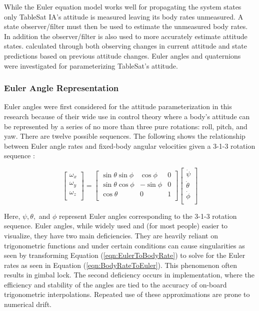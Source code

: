While the Euler equation model works well for propagating the system states only TableSat IA's attitude is measured leaving its body rates unmeasured.  A state observer/filter must then be used to estimate the unmeasured body rates.  In addition the observer/filter is also used to more accurately estimate attitude states. calculated through both observing changes in current attitude and state predictions based on previous attitude changes.  Euler angles and quaternions were investigated for parameterizing TableSat's attitude.

\subsubsection{Euler Angle Representation}

Euler angles were first considered for the attitude parameterization in this research because of their wide use in control theory where a body's attitude can be represented by a series of no more than three pure rotations: roll, pitch, and yaw.   There are twelve possible sequences.  The following shows the relationship between Euler angle rates and fixed-body angular velocities given a 3-1-3 rotation sequence \cite{kaplan}:

\begin{equation}
  \begin{bmatrix}
    \omega_x \\
    \omega_y \\
    \omega_z \\
  \end{bmatrix}
  =
  \begin{bmatrix}
    \sin \theta \sin \phi & \cos \phi & 0 \\
    \sin \theta \cos \phi & - \sin \phi & 0 \\
    \cos \theta & 0 & 1 \\
  \end{bmatrix}
  \begin{bmatrix}
    \dot{\psi} \\
    \dot{\theta} \\
    \dot{\phi} \\
  \end{bmatrix}
  \label{eqn:EulerToBodyRate}
\end{equation}

Here, $\psi, \theta,$ and $\phi$ represent Euler angles corresponding to the 3-1-3 rotation sequence.  Euler angles, while widely used and (for most people) easier to visualize, they have two main deficiencies.  They are heavily reliant on trigonometric functions and under certain conditions can cause singularities as seen by transforming Equation (\ref{eqn:EulerToBodyRate}) to solve for the Euler rates as seen in Equation (\ref{eqn:BodyRateToEuler}).  This phenomenon often results in gimbal lock.  The second deficiency occurs in implementation, where the efficiency and stability of the angles are tied to the accuracy of on-board trigonometric interpolations.  Repeated use of these approximations are prone to numerical drift.

